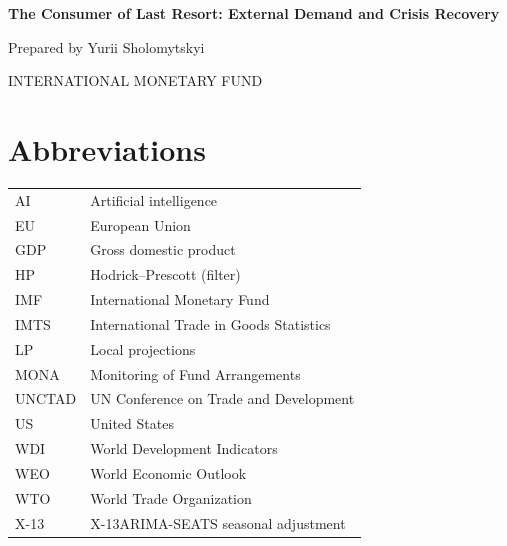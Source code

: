 \documentclass[12pt, a4paper]{article}
\newcommand{\PaperTitle}{The Consumer of Last Resort: External Demand and Crisis Recovery}
\begin{document}
\vspace{2cm}
{\huge \bfseries \sffamily \PaperTitle \par}

\vspace{2cm}
{\large \sffamily Prepared by Yurii Sholomytskyi \par}

\vfill
{\scriptsize \color{gray} INTERNATIONAL MONETARY FUND \par}

\clearpage
\endgroup

\sffamily
\tableofcontents
\clearpage
\rmfamily

\section*{Abbreviations}
\vspace{0.3cm}
\noindent\renewcommand{\arraystretch}{1.25}\begin{tabular}{@{}l@{\hskip 2.5em}l@{}}
AI & Artificial intelligence \\
EU & European Union \\
GDP & Gross domestic product \\
HP & Hodrick--Prescott (filter) \\
IMF & International Monetary Fund \\
IMTS & International Trade in Goods Statistics \\
LP & Local projections \\
MONA & Monitoring of Fund Arrangements \\
UNCTAD & UN Conference on Trade and Development \\
US & United States \\
WDI & World Development Indicators \\
WEO & World Economic Outlook \\
WTO & World Trade Organization \\
X-13 & X-13ARIMA-SEATS seasonal adjustment \\
\end{tabular}

\clearpage
\onehalfspacing
\end{document}
